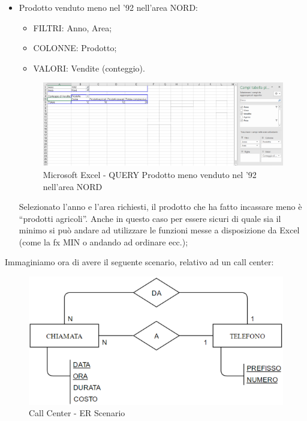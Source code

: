 \begin{itemize}
\item Prodotto venduto meno nel ’92 nell’area NORD:

\begin{itemize}
\item{FILTRI}: Anno, Area;
\item{COLONNE}: Prodotto;
\item{VALORI}: Vendite (conteggio).
\end{itemize}

\begin{center}
\begin{figure}[H]
\centering
\includegraphics[scale=0.8]{figures/worst_product.png}
\caption{Microsoft Excel - QUERY Prodotto meno venduto nel '92 nell'area NORD}
\end{figure}
\end{center}

Selezionato l’anno e l’area richiesti, il prodotto che ha fatto incassare meno è “prodotti agricoli”. Anche in questo caso per essere sicuri di quale sia il minimo si può andare ad utilizzare le funzioni messe a disposizione da Excel (come la fx MIN o andando ad ordinare ecc.);

\end{itemize}

Immaginiamo ora di avere il seguente scenario, relativo ad un call center: 

\begin{center}
\begin{figure}[H]
\centering
\includegraphics[scale=1]{figures/call_center.png}
\caption{Call Center - ER Scenario}
\end{figure}
\end{center}

